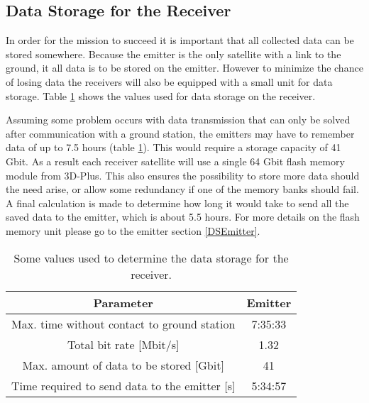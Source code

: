 \subsection{Data Storage for the Receiver}
\label{DSReceiver}

In order for the mission to succeed it is important that all collected data can be stored somewhere. Because the emitter is the only satellite with a link to the ground, it all data is to be stored on the emitter. However to minimize the chance of losing data the receivers will also be equipped with a small unit for data storage. Table \ref{DSReceiverTable} shows the values used for data storage on the receiver. 

Assuming some problem occurs with data transmission that can only be solved after communication with a ground station, the emitters may have to remember data of up to 7.5 hours (table \ref{DSReceiverTable}). This would require a storage capacity of 41 Gbit. As a result each receiver satellite will use a single 64 Gbit flash memory module from 3D-Plus. This also ensures the possibility to store more data should the need arise, or allow some redundancy if one of the memory banks should fail. A final calculation is made to determine how long it would take to send all the saved data to the emitter, which is about 5.5 hours. For more details on the flash memory unit please go to the emitter section \ref{DSEmitter}.

\begin{table}
\centering
\begin{tabular}{c|c}
\textbf{Parameter}  & \textbf{Emitter} \\\hline\hline
	Max. time without contact to ground station & 7:35:33 \\
	Total bit rate [Mbit/s] & 1.32 \\
	Max. amount of data to be stored [Gbit] & 41 \\
	Time required to send data to the emitter [s] & 5:34:57 \\
\end{tabular}
\caption{Some values used to determine the data storage for the receiver.}
\label{DSReceiverTable}
\end{table}